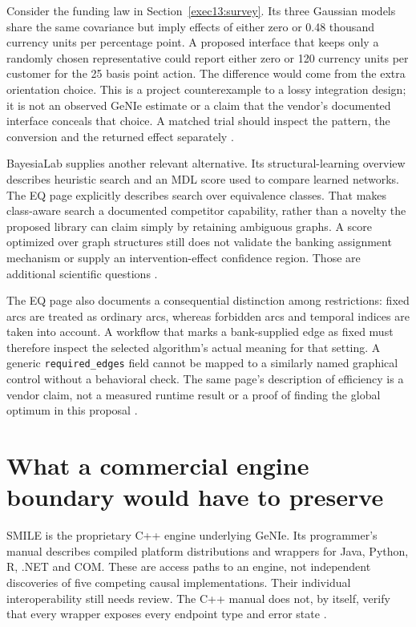 Consider the funding law in Section~\ref{exec13:survey}. Its three Gaussian
models share the same covariance but imply effects of either zero or 0.48
thousand currency units per percentage point. A proposed interface that keeps
only a randomly chosen representative could report either zero or 120 currency
units per customer for the 25 basis point action. The difference would come
from the extra orientation choice. This is a project counterexample to a
lossy integration design; it is not an observed GeNIe estimate or a claim
that the vendor's documented interface conceals that choice. A matched trial
should inspect the pattern, the conversion and the returned effect separately
\citep{exec13_examples}.

BayesiaLab supplies another relevant alternative. Its structural-learning
overview describes heuristic search and an MDL score used to compare learned
networks. The EQ page explicitly describes search over equivalence classes.
That makes class-aware search a documented competitor capability, rather
than a novelty the proposed library can claim simply by retaining ambiguous
graphs. A score optimized over graph structures still does not validate
the banking assignment mechanism or supply an intervention-effect confidence
region. Those are additional scientific questions
\citep{exec13_bayesia_structure,exec13_bayesia_eq}.

The EQ page also documents a consequential distinction among restrictions:
fixed arcs are treated as ordinary arcs, whereas forbidden arcs and temporal
indices are taken into account. A workflow that marks a bank-supplied edge
as fixed must therefore inspect the selected algorithm's actual meaning for
that setting. A generic \texttt{required\_edges} field cannot be mapped to a
similarly named graphical control without a behavioral check. The same page's
description of efficiency is a vendor claim, not a measured runtime result
or a proof of finding the global optimum in this proposal
\citep{exec13_bayesia_eq}.

\section{What a commercial engine boundary would have to preserve}

SMILE is the proprietary C++ engine underlying GeNIe. Its programmer's manual
describes compiled platform distributions and wrappers for Java, Python, R,
.NET and COM. These are access paths to an engine, not independent discoveries
of five competing causal implementations. Their individual interoperability
still needs review. The C++ manual does not, by itself, verify that every
wrapper exposes every endpoint type and error state
\citep{exec13_smile_intro}.


